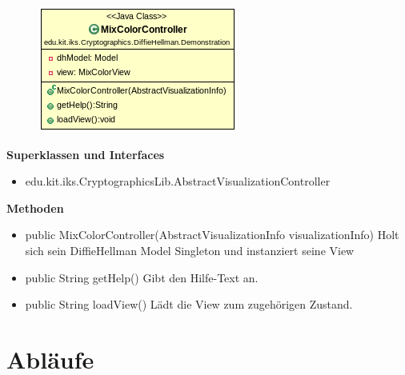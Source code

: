 \documentclass{article}
\begin{document}
      \begin{figure}[H]
        \centering
        \includegraphics[width=\textwidth]{resources/edu-kit-iks-Cryptographics-DiffieHellman-Demonstration-MixColorController}
      \end{figure}

      \textbf{Superklassen und Interfaces}
      \begin{itemize}
        \item edu.kit.iks.CryptographicsLib.AbstractVisualizationController
      \end{itemize}

      \textbf{Methoden}
      \begin{itemize}
          \item public MixColorController(AbstractVisualizationInfo visualizationInfo) \newline
              Holt sich sein DiffieHellman Model Singleton und instanziert seine View
        \item public String getHelp() \newline
        Gibt den Hilfe-Text an.
        \item public String loadView() \newline
        Lädt die View zum zugehörigen Zustand.
      \end{itemize}

\section{Abläufe}

\glsaddall
\printglossary[numberedsection, style=altlist]
\end{document}
